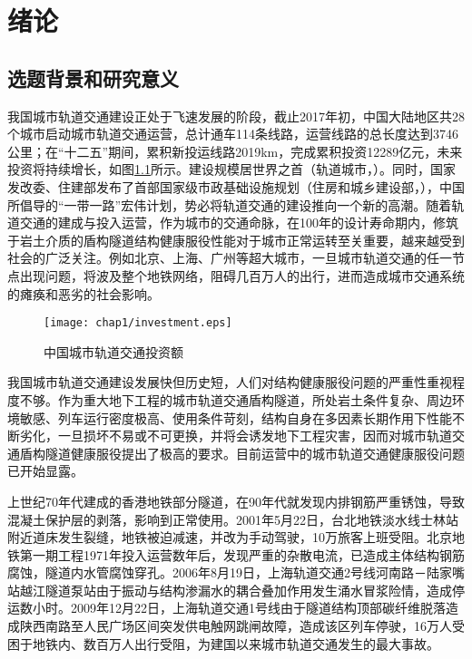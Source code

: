 \chapter{绪论}

\section{选题背景和研究意义}

我国城市轨道交通建设正处于飞速发展的阶段，截止2017年初，中国大陆地区共28个城市启动城市轨道交通运营，总计通车114条线路，运营线路的总长度达到3746公里；在“十二五”期间，累积新投运线路2019km，完成累积投资12289亿元，未来投资将持续增长，如图\ref{fig:城市轨道交通投资额}所示。建设规模居世界之首（轨道城市，\citeyear{轨道2017}）。同时，国家发改委、住建部发布了首部国家级市政基础设施规划（住房和城乡建设部，\citeyear{住房和城乡建设部}），中国所倡导的“一带一路”宏伟计划，势必将轨道交通的建设推向一个新的高潮。随着轨道交通的建成与投入运营，作为城市的交通命脉，在100年的设计寿命期内，修筑于岩土介质的盾构隧道结构健康服役性能对于城市正常运转至关重要，越来越受到社会的广泛关注。例如北京、上海、广州等超大城市，一旦城市轨道交通的任一节点出现问题，将波及整个地铁网络，阻碍几百万人的出行，进而造成城市交通系统的瘫痪和恶劣的社会影响。

\begin{figure}[!h]
	\centering
	\texttt{[image: chap1/investment.eps]}
	\caption{中国城市轨道交通投资额}
	\label{fig:城市轨道交通投资额}
\end{figure}

我国城市轨道交通建设发展快但历史短，人们对结构健康服役问题的严重性重视程度不够。作为重大地下工程的城市轨道交通盾构隧道，所处岩土条件复杂、周边环境敏感、列车运行密度极高、使用条件苛刻，结构自身在多因素长期作用下性能不断劣化，一旦损坏不易或不可更换，并将会诱发地下工程灾害，因而对城市轨道交通盾构隧道健康服役提出了极高的要求。目前运营中的城市轨道交通健康服役问题已开始显露。

上世纪70年代建成的香港地铁部分隧道，在90年代就发现内排钢筋严重锈蚀，导致混凝土保护层的剥落，影响到正常使用。2001年5月22日，台北地铁淡水线士林站附近道床发生裂缝，地铁被迫减速，并改为手动驾驶，10万旅客上班受阻。北京地铁第一期工程1971年投入运营数年后，发现严重的杂散电流，已造成主体结构钢筋腐蚀，隧道内水管腐蚀穿孔。2006年8月19日，上海轨道交通2号线河南路－陆家嘴站越江隧道泵站由于振动与结构渗漏水的耦合叠加作用发生涌水冒浆险情，造成停运数小时。2009年12月22日，上海轨道交通1号线由于隧道结构顶部碳纤维脱落造成陕西南路至人民广场区间突发供电触网跳闸故障，造成该区列车停驶，16万人受困于地铁内、数百万人出行受阻，为建国以来城市轨道交通发生的最大事故。 

